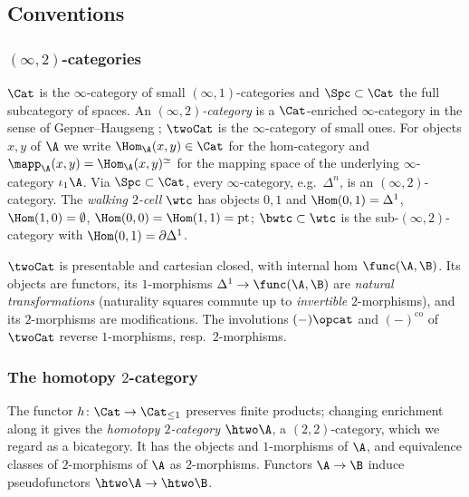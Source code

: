 \subsection{Conventions}
\label{subsec:2dloc-conventions}

\subsubsection*{$(\infty,2)$-categories}
$\Cat$ is the $\infty$-category of small $(\infty,1)$-categories and $\Spc \subset \Cat$ the full subcategory of spaces.
An \emph{$(\infty,2)$-category} is a $\Cat$-enriched $\infty$-category in the sense of Gepner--Haugseng \cite{gepnerhaugseng2015enriched}; $\twoCat$ is the $\infty$-category of small ones.
For objects $x,y$ of $\A$ we write $\Hom_{\A}(x,y) \in \Cat$ for the hom-category and $\mapp_{\A}(x,y) = \Hom_{\A}(x,y)^{\simeq}$ for the mapping space of the underlying $\infty$-category $\iota_{1}\A$.
Via $\Spc \subset \Cat$, every $\infty$-category, e.g.\ $\Delta^{n}$, is an $(\infty,2)$-category. The \emph{walking $2$-cell} $\wtc$ has objects $0,1$ and $\Hom(0,1) = \Delta^{1}$, $\Hom(1,0) = \emptyset$, $\Hom(0,0) = \Hom(1,1) = \mathrm{pt}$; $\bwtc \subset \wtc$ is the sub-$(\infty,2)$-category with $\Hom(0,1) = \partial\Delta^{1}$.

$\twoCat$ is presentable and cartesian closed, with internal hom $\func(\A,\B)$.
Its objects are functors, its $1$-morphisms $\Delta^{1} \to \func(\A,\B)$ are \emph{natural transformations} (naturality squares commute up to \emph{invertible} $2$-morphisms), and its $2$-morphisms are modifications.
The involutions $(-)\opcat$ and $(-)^{\mathrm{co}}$ of $\twoCat$ reverse $1$-morphisms, resp.\ $2$-morphisms.

\subsubsection*{The homotopy $2$-category}
The functor $h\colon \Cat \to \Cat_{\leq 1}$ preserves finite products; changing enrichment along it \cite{gepnerhaugseng2015enriched} gives the \emph{homotopy $2$-category} $\htwo\A$, a $(2,2)$-category, which we regard as a bicategory.
It has the objects and $1$-morphisms of $\A$, and equivalence classes of $2$-morphisms of $\A$ as $2$-morphisms. Functors $\A \to \B$ induce pseudofunctors $\htwo\A \to \htwo\B$.

